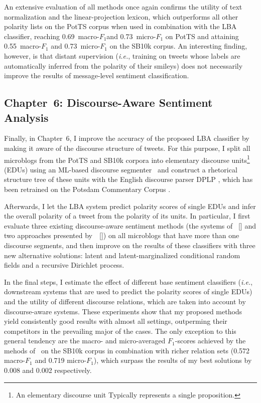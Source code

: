\documentclass[11pt]{article}
\newcommand{\ienocomma}{\textit{i.e.}}
\newcommand{\ie}{\ienocomma,}
\newcommand{\F}[0]{$F_1$}
\renewcommand{\cite}{\citep}
\begin{document}
An extensive evaluation of all methods once again confirms the utility
of text normalization and the linear-projection lexicon, which
outperforms all other polarity lists on the PotTS corpus when used in
combination with the LBA classifier, reaching 0.69~macro-\F and
0.73~micro-\F{} on PotTS and attaining 0.55~macro-\F{} and
0.73~micro-\F{} on the SB10k corpus.  An interesting finding, however,
is that distant supervision (\ie{} training on tweets whose labels are
automatically inferred from the polarity of their smileys) does not
necessarily improve the results of message-level sentiment
classification.

\subsection{Chapter~6: Discourse-Aware Sentiment Analysis}

Finally, in Chapter~6, I improve the accuracy of the proposed LBA
classifier by making it aware of the discourse structure of tweets.
For this purpose, I split all microblogs from the PotTS and SB10k
corpora into elementary discourse units\footnote{An elementary
  discourse unit Typically represents a single proposition.} (EDUs)
using an ML-based discourse segmenter~\cite{Sidarenka:15} and
construct a rhetorical structure tree of these units \cite{Mann:88}
with the English discourse parser DPLP \cite{Ji:14}, which has been
retrained on the Potsdam Commentary Corpus \cite{Stede:14}.

Afterwards, I let the LBA system predict polarity scores of single
EDUs and infer the overall polarity of a tweet from the polarity of
its units.  In particular, I first evaluate three existing
discourse-aware sentiment methods (the systems of
\citeauthor{Wang:13}~[\citeyear{Wang:13}] and two approaches presented
by~\citeauthor{Bhatia:15}~[\citeyear{Bhatia:15}]) on all microblogs
that have more than one discourse segments, and then improve on the
results of these classifiers with three new alternative solutions:
latent and latent-marginalized conditional random fields and a
recursive Dirichlet process.

In the final steps, I estimate the effect of different base sentiment
classifiers (\ie{} downstream systems that are used to predict the
polarity scores of single EDUs) and the utility of different discourse
relations, which are taken into account by discourse-aware systems.
These experiments show that my proposed methods yield consistently
good results with almost all settings, outperming their competitors in
the prevailing major of the cases.  The only exception to this general
tendency are the macro- and micro-averaged \F{}-scores achieved by the
mehods of~\citet{Bhatia:15} on the SB10k corpus in combination with
richer relation sets (0.572 macro-\F{} and 0.719 micro-\F{}), which
surpass the results of my best solutions by 0.008 and 0.002
respectively.
\end{document}

